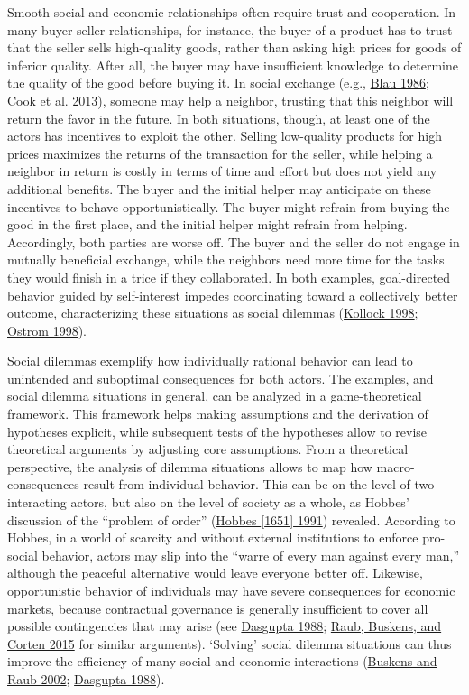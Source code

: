 \documentclass[
  11pt,
]{article}
\begin{document}
Smooth social and economic relationships often require trust and cooperation.
In many buyer-seller relationships, for instance, the buyer of a product has to trust that the seller sells high-quality goods, rather than asking high prices for goods of inferior quality.
After all, the buyer may have insufficient knowledge to determine the quality of the good before buying it.
In social exchange (e.g., \protect\hyperlink{ref-blau1964exchange}{Blau 1986}; \protect\hyperlink{ref-Cook2013}{Cook et al. 2013}), someone may help a neighbor, trusting that this neighbor will return the favor in the future.
In both situations, though, at least one of the actors has incentives to exploit the other.
Selling low-quality products for high prices maximizes the returns of the transaction for the seller, while helping a neighbor in return is costly in terms of time and effort but does not yield any additional benefits.
The buyer and the initial helper may anticipate on these incentives to behave opportunistically.
The buyer might refrain from buying the good in the first place, and the initial helper might refrain from helping.
Accordingly, both parties are worse off.
The buyer and the seller do not engage in mutually beneficial exchange, while the neighbors need more time for the tasks they would finish in a trice if they collaborated.
In both examples, goal-directed behavior guided by self-interest impedes coordinating toward a collectively better outcome, characterizing these situations as social dilemmas (\protect\hyperlink{ref-kollock_social_1998}{Kollock 1998}; \protect\hyperlink{ref-ostrom_behavioral_1998}{Ostrom 1998}).

Social dilemmas exemplify how individually rational behavior can lead to unintended and suboptimal consequences for both actors.
The examples, and social dilemma situations in general, can be analyzed in a game-theoretical framework.
This framework helps making assumptions and the derivation of hypotheses explicit, while subsequent tests of the hypotheses allow to revise theoretical arguments by adjusting core assumptions.
From a theoretical perspective, the analysis of dilemma situations allows to map how macro-consequences result from individual behavior.
This can be on the level of two interacting actors, but also on the level of society as a whole, as Hobbes' discussion of the ``problem of order'' (\protect\hyperlink{ref-hobbes_leviathan}{Hobbes {[}1651{]} 1991}) revealed.
According to Hobbes, in a world of scarcity and without external institutions to enforce pro-social behavior, actors may slip into the ``warre of every man against every man,'' although the peaceful alternative would leave everyone better off.
Likewise, opportunistic behavior of individuals may have severe consequences for economic markets, because contractual governance is generally insufficient to cover all possible contingencies that may arise (see \protect\hyperlink{ref-dasgupta_1988}{Dasgupta 1988}; \protect\hyperlink{ref-raub_etal_social_2015}{Raub, Buskens, and Corten 2015} for similar arguments).
`Solving' social dilemma situations can thus improve the efficiency of many social and economic interactions (\protect\hyperlink{ref-buskens_raub_embedded_2002}{Buskens and Raub 2002}; \protect\hyperlink{ref-dasgupta_1988}{Dasgupta 1988}).
\end{document}
